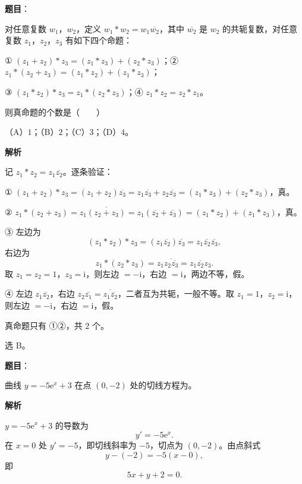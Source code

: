 \begin{answer}

\textbf{题目}：

对任意复数 $w_1$，$w_2$，定义 $w_1*w_2=w_1\overline{w_2}$，其中 $\overline{w_2}$ 是 $w_2$ 的共轭复数，对任意复数 $z_1$，$z_2$，$z_3$ 有如下四个命题：

① $(z_1+z_2)*z_3=(z_1*z_3)+(z_2*z_3)$；② $z_1*(z_2+z_3)=(z_1*z_2)+(z_1*z_3)$；

③ $(z_1*z_2)*z_3=z_1*(z_2*z_3)$；④ $z_1*z_2=z_2*z_1$。

则真命题的个数是\mbox{（　　）}

（A）$1$；（B）$2$；（C）$3$；（D）$4$。

\textbf{解析}

记 $z_1*z_2=z_1\overline{z_2}$。逐条验证：

① $(z_1+z_2)*z_3=(z_1+z_2)\overline{z_3}=z_1\overline{z_3}+z_2\overline{z_3}=(z_1*z_3)+(z_2*z_3)$，真。

② $z_1*(z_2+z_3)=z_1\overline{(z_2+z_3)}=z_1(\overline{z_2}+\overline{z_3})=(z_1*z_2)+(z_1*z_3)$，真。

③ 左边为
\nopagebreak[4]
\[(z_1*z_2)*z_3=(z_1\overline{z_2})\overline{z_3}=z_1\overline{z_2}\overline{z_3},\]
右边为
\nopagebreak[4]
\[z_1*(z_2*z_3)=z_1\overline{z_2\overline{z_3}}=z_1\overline{z_2}z_3 .\]
取 $z_1=z_2=1$，$z_3=\mathrm i$，则左边 $=-\mathrm i$，右边 $=\mathrm i$，两边不等，假。

④ 左边 $z_1\overline{z_2}$，右边 $z_2\overline{z_1}=\overline{z_1\overline{z_2}}$，二者互为共轭，一般不等。取 $z_1=1$，$z_2=\mathrm i$，则左边 $=-\mathrm i$，右边 $=\mathrm i$，假。

真命题只有 ①②，共 $2$ 个。

选 B。


\end{answer}
\begin{answer}

\textbf{题目}：

曲线 $y=-5\mathrm e^x+3$ 在点 $(0,-2)$ 处的切线方程为\gkblank{}。

\textbf{解析}

$y=-5\mathrm e^x+3$ 的导数为
\nopagebreak[4]
\[y'=-5\mathrm e^x .\]
在 $x=0$ 处 $y'=-5$，即切线斜率为 $-5$，切点为 $(0,-2)$。由点斜式
\nopagebreak[4]
\[y-(-2)=-5(x-0),\]
即
\nopagebreak[4]
\[5x+y+2=0 .\]


\end{answer}
